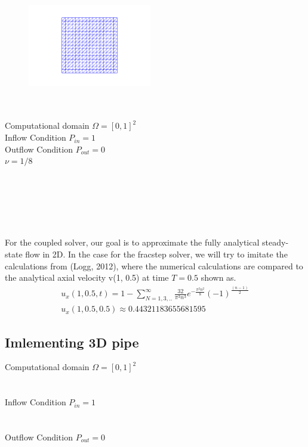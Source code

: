 \documentclass[a4paper,norsk]{article}
\begin{document}
\begin{figure}
  \vspace{-20pt}
  \begin{center}
    \includegraphics[width=0.48\textwidth]{mesh16.png}
  \end{center}
  \vspace{-20pt}
\end{figure}
\text{}
\\ \\ Computational domain $\Omega = [0,1]^2$ \\
Inflow Condition \hspace{2mm} $P_{in} = 1$ \\
Outflow Condition \hspace{2mm} $P_{out} = 0$ \\
$\nu = 1/8$ \\ \\ \\ \\ \\ \\ \\
For the coupled solver, our goal is to approximate the fully analytical steady-state flow in 2D.
In the case for the fracstep solver, we will try to imitate the calculations from  (Logg, 2012),
where the numerical calculations are compared to the analytical axial velocity v(1, 0.5) at time $T = 0.5$ shown as.
\begin{align*}
u_x(1, 0.5, t) = 1 - \sum_{N=1,3,..}^{\infty} \frac{32}{\pi^3n^3}
e^{-\frac{\pi^2 n^2}{8}}(-1)^\frac{(n-1)}{2} \\
u_x(1, 0.5, 0.5) \approx 0.44321183655681595
\end{align*}

\newpage
\subsection*{Imlementing 3D pipe}
Computational domain $\Omega = [0,1]^2$ \\ \\ \\
Inflow Condition \hspace{2mm} $P_{in} = 1$ \\ \\ \\
Outflow Condition \hspace{2mm} $P_{out} = 0$ \\ \\
\end{document}
